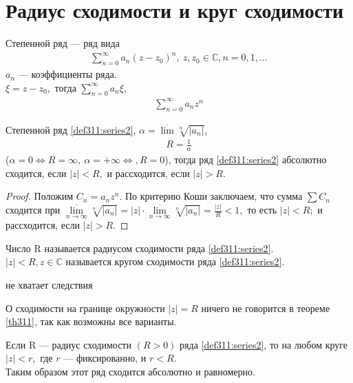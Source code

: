 \section{Радиус сходимости и круг сходимости}
\begin{definition}
  Степенной ряд --- ряд вида
  \begin{gather}
    \sum\limits_{n = 0}^{\infty} a_n(z - z_0)^n, \ z, z_0 \in \mathbb{C}, n = 0, 1, \dots
    \label{def311:series1}
  \end{gather}
  $a_n$ --- коэффициенты ряда. \\
  $\xi = z - z_0, $ тогда
  $\sum\limits_{n = 0}^{\infty} a_n \xi$,
  \begin{gather}
    \sum\limits_{n = 0}^{\infty} a_n z^n \label{def311:series2}
  \end{gather}
\end{definition}

\begin{theorem}
  \label{th311}
  Степенной ряд \eqref{def311:series2}, $\alpha = \overline{\lim} \sqrt[n]{|a_n|}$,
  \begin{gather}
    R = \frac{1}{\alpha} \label{def311:eq1}
  \end{gather}
  ($\alpha = 0 \Longleftrightarrow R = \infty, \
  \alpha = +\infty \Longleftrightarrow, R = 0$), тогда ряд \eqref{def311:series2}
  абсолютно сходится, если $|z| < R,$ и рассходится, если $|z| > R$.
\end{theorem}

\begin{proof}
  Положим $C_n = a_n z^n$. По критерию Коши заключаем, что сумма
  $\sum C_n$ сходится при $\overline{\lim\limits_{n \to \infty}} \sqrt[n]{|a_n|}
  = |z|\cdot \overline{\lim\limits_{n \to \infty}} \sqrt[n]{|a_n|} =
  \frac{|z|}{R} < 1,$ то есть $|z| < R;$ и рассходится, если $|z| > R$.
\end{proof}

\begin{definition}
  Число R называется радиусом сходимости ряда \eqref{def311:series2}. \\
  $|z| < R, z \in \mathbb{C}$ называется кругом сходимости ряда
  \eqref{def311:series2}.
\end{definition}
не хватает следствия
\begin{remark}
  О сходимости на границе окружности $|z| = R$ ничего не говорится в теореме
  \eqref{th311}, так как возможны все варианты.
\end{remark}

\begin{theorem}
  \label{th312}
  Если R --- радиус сходимости $(R > 0)$ ряда \eqref{def311:series2}, то на любом
  круге $|z| < r, $ где $r$ --- фиксированно, и $r < R$. \\
  Таким образом этот ряд сходится абсолютно и равномерно.
\end{theorem}

